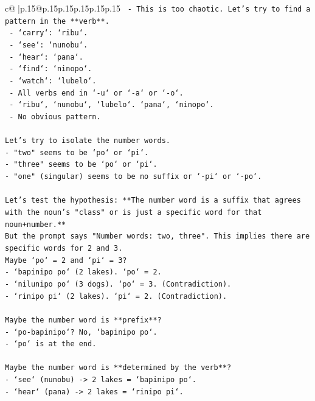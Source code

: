 \documentclass{article}
\begin{document}
{\begin{supertabular}{c@{$\;$}|p{.15\linewidth}@{}p{.15\linewidth}p{.15\linewidth}p{.15\linewidth}p{.15\linewidth}p{.15\linewidth}}
{{{\texttt{     {-} This is too chaotic. Let's try to find a pattern in the **verb**.} \\
\texttt{       {-} `carry`: `ribu`.} \\
\texttt{       {-} `see`: `nunobu`.} \\
\texttt{       {-} `hear`: `pana`.} \\
\texttt{       {-} `find`: `ninopo`.} \\
\texttt{       {-} `watch`: `lubelo`.} \\
\texttt{     {-} All verbs end in `{-}u` or `{-}a` or `{-}o`.} \\
\texttt{     {-} `ribu`, `nunobu`, `lubelo`. `pana`, `ninopo`.} \\
\texttt{     {-} No obvious pattern.} \\
\\ 
\texttt{Let's try to isolate the number words.} \\
\texttt{{-} "two" seems to be `po` or `pi`.} \\
\texttt{{-} "three" seems to be `po` or `pi`.} \\
\texttt{{-} "one" (singular) seems to be no suffix or `{-}pi` or `{-}po`.} \\
\\ 
\texttt{Let's test the hypothesis: **The number word is a suffix that agrees with the noun's "class" or is just a specific word for that noun+number.**} \\
\texttt{But the prompt says "Number words: two, three". This implies there are specific words for 2 and 3.} \\
\texttt{Maybe `po` = 2 and `pi` = 3?} \\
\texttt{{-} `bapinipo po` (2 lakes). `po` = 2.} \\
\texttt{{-} `nilunipo po` (3 dogs). `po` = 3. (Contradiction).} \\
\texttt{{-} `rinipo pi` (2 lakes). `pi` = 2. (Contradiction).} \\
\\ 
\texttt{Maybe the number word is **prefix**?} \\
\texttt{{-} `po{-}bapinipo`? No, `bapinipo po`.} \\
\texttt{{-} `po` is at the end.} \\
\\ 
\texttt{Maybe the number word is **determined by the verb**?} \\
\texttt{{-} `see` (nunobu) {-}> 2 lakes = `bapinipo po`.} \\
\texttt{{-} `hear` (pana) {-}> 2 lakes = `rinipo pi`.} \\
}}}
\end{supertabular}}
\end{document}
